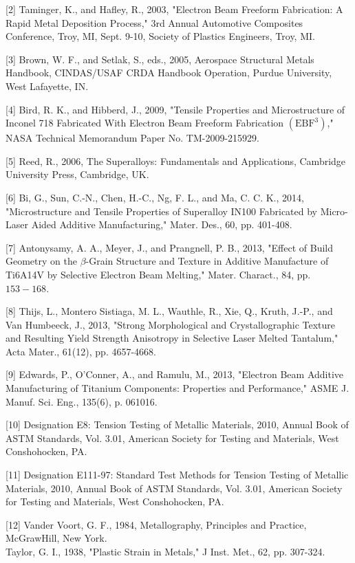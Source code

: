 \documentclass[10pt]{article}
\begin{document}
[2] Taminger, K., and Hafley, R., 2003, "Electron Beam Freeform Fabrication: A Rapid Metal Deposition Process," 3rd Annual Automotive Composites Conference, Troy, MI, Sept. 9-10, Society of Plastics Engineers, Troy, MI.

[3] Brown, W. F., and Setlak, S., eds., 2005, Aerospace Structural Metals Handbook, CINDAS/USAF CRDA Handbook Operation, Purdue University, West Lafayette, IN.

[4] Bird, R. K., and Hibberd, J., 2009, "Tensile Properties and Microstructure of Inconel 718 Fabricated With Electron Beam Freeform Fabrication $\left(\mathrm{EBF}^{3}\right)$," NASA Technical Memorandum Paper No. TM-2009-215929.

[5] Reed, R., 2006, The Superalloys: Fundamentals and Applications, Cambridge University Press, Cambridge, UK.

[6] Bi, G., Sun, C.-N., Chen, H.-C., Ng, F. L., and Ma, C. C. K., 2014, "Microstructure and Tensile Properties of Superalloy IN100 Fabricated by Micro-Laser Aided Additive Manufacturing," Mater. Des., 60, pp. 401-408.

[7] Antonysamy, A. A., Meyer, J., and Prangnell, P. B., 2013, "Effect of Build Geometry on the $\beta$-Grain Structure and Texture in Additive Manufacture of Ti6A14V by Selective Electron Beam Melting," Mater. Charact., 84, pp. $153-168$.

[8] Thijs, L., Montero Sistiaga, M. L., Wauthle, R., Xie, Q., Kruth, J.-P., and Van Humbeeck, J., 2013, "Strong Morphological and Crystallographic Texture and Resulting Yield Strength Anisotropy in Selective Laser Melted Tantalum," Acta Mater., 61(12), pp. 4657-4668.

[9] Edwards, P., O’Conner, A., and Ramulu, M., 2013, "Electron Beam Additive Manufacturing of Titanium Components: Properties and Performance," ASME J. Manuf. Sci. Eng., 135(6), p. 061016.

[10] Designation E8: Tension Testing of Metallic Materials, 2010, Annual Book of ASTM Standards, Vol. 3.01, American Society for Testing and Materials, West Conshohocken, PA.

[11] Designation E111-97: Standard Test Methods for Tension Testing of Metallic Materials, 2010, Annual Book of ASTM Standards, Vol. 3.01, American Society for Testing and Materials, West Conshohocken, PA.

[12] Vander Voort, G. F., 1984, Metallography, Principles and Practice, McGrawHill, New York.\\
[13] Taylor, G. I., 1938, "Plastic Strain in Metals," J Inst. Met., 62, pp. 307-324.
\end{document}
